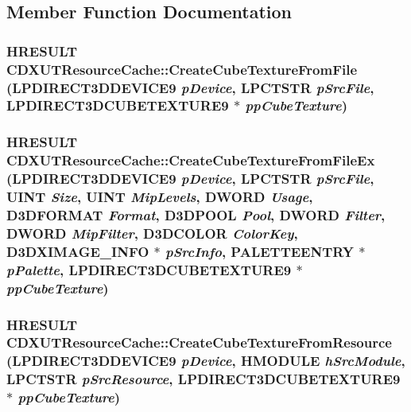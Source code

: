 \subsection{Member Function Documentation}
\hypertarget{class_c_d_x_u_t_resource_cache_ac81b19e2dfca7f4ef542425007b6cfc8}{
\subsubsection[{CreateCubeTextureFromFile}]{\setlength{\rightskip}{0pt plus 5cm}HRESULT CDXUTResourceCache::CreateCubeTextureFromFile (LPDIRECT3DDEVICE9 {\em pDevice}, \/  LPCTSTR {\em pSrcFile}, \/  LPDIRECT3DCUBETEXTURE9 $\ast$ {\em ppCubeTexture})}}
\label{class_c_d_x_u_t_resource_cache_ac81b19e2dfca7f4ef542425007b6cfc8}
\hypertarget{class_c_d_x_u_t_resource_cache_a3c03e924cfd9af63363f5976f266c14e}{
\subsubsection[{CreateCubeTextureFromFileEx}]{\setlength{\rightskip}{0pt plus 5cm}HRESULT CDXUTResourceCache::CreateCubeTextureFromFileEx (LPDIRECT3DDEVICE9 {\em pDevice}, \/  LPCTSTR {\em pSrcFile}, \/  UINT {\em Size}, \/  UINT {\em MipLevels}, \/  DWORD {\em Usage}, \/  D3DFORMAT {\em Format}, \/  D3DPOOL {\em Pool}, \/  DWORD {\em Filter}, \/  DWORD {\em MipFilter}, \/  D3DCOLOR {\em ColorKey}, \/  D3DXIMAGE\_\-INFO $\ast$ {\em pSrcInfo}, \/  PALETTEENTRY $\ast$ {\em pPalette}, \/  LPDIRECT3DCUBETEXTURE9 $\ast$ {\em ppCubeTexture})}}
\label{class_c_d_x_u_t_resource_cache_a3c03e924cfd9af63363f5976f266c14e}
\hypertarget{class_c_d_x_u_t_resource_cache_a778a88f6051a949abb95dc1923c13b83}{
\subsubsection[{CreateCubeTextureFromResource}]{\setlength{\rightskip}{0pt plus 5cm}HRESULT CDXUTResourceCache::CreateCubeTextureFromResource (LPDIRECT3DDEVICE9 {\em pDevice}, \/  HMODULE {\em hSrcModule}, \/  LPCTSTR {\em pSrcResource}, \/  LPDIRECT3DCUBETEXTURE9 $\ast$ {\em ppCubeTexture})}}
